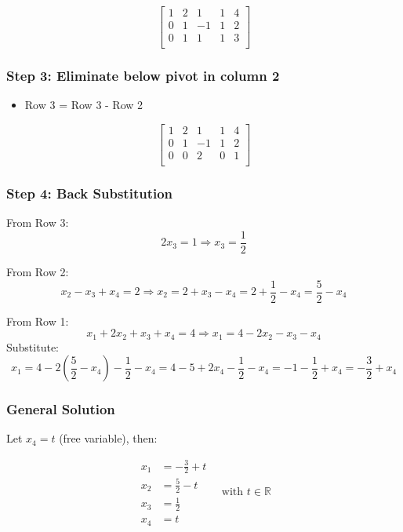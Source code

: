 \[
	\begin{bmatrix}
		1 & 2 & 1  & 1 & 4 \\
		0 & 1 & -1 & 1 & 2 \\
		0 & 1 & 1  & 1 & 3 \\
	\end{bmatrix}
\]

\subsubsection*{Step 3: Eliminate below pivot in column 2}

\begin{itemize}[label=\(-\)]
	\item Row 3 = Row 3 - Row 2
\end{itemize}

\[
	\begin{bmatrix}
		1 & 2 & 1  & 1 & 4 \\
		0 & 1 & -1 & 1 & 2 \\
		0 & 0 & 2  & 0 & 1 \\
	\end{bmatrix}
\]

\subsubsection*{Step 4: Back Substitution}

From Row 3:
\[
	2x_3 = 1 \Rightarrow x_3 = \frac{1}{2}
\]

From Row 2:
\[
	x_2 - x_3 + x_4 = 2 \Rightarrow x_2 = 2 + x_3 - x_4 = 2 + \frac{1}{2} - x_4 = \frac{5}{2} - x_4
\]

From Row 1:
\[
	x_1 + 2x_2 + x_3 + x_4 = 4
	\Rightarrow x_1 = 4 - 2x_2 - x_3 - x_4
\]
Substitute:
\[
	x_1 = 4 - 2\left( \frac{5}{2} - x_4 \right) - \frac{1}{2} - x_4
	= 4 - 5 + 2x_4 - \frac{1}{2} - x_4
	= -1 - \frac{1}{2} + x_4 = -\frac{3}{2} + x_4
\]

\subsubsection*{General Solution}

Let \(x_4 = t\) (free variable), then:

\[
	\begin{aligned}
		x_1 & = -\frac{3}{2} + t \\
		x_2 & = \frac{5}{2} - t  \\
		x_3 & = \frac{1}{2}      \\
		x_4 & = t
	\end{aligned}
	\quad \text{with } t \in \mathbb{R}
\]

